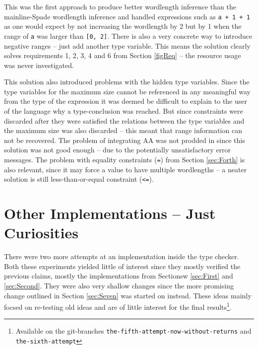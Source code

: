 This was the first approach to produce better wordlength inference than the mainline-Spade wordlength inference and handled expressions such as \verb!a + 1 + 1! as one would expect by not increasing the wordlength by 2 but by 1 when the range of \verb+a+ was larger than \verb+[0, 2]+. There is also a very concrete way to introduce negative ranges -- just add another type variable. This means the solution clearly solves requirements 1, 2, 3, 4 and 6 from Section \ref{figReq} -- the resource usage was never investigated.

This solution also introduced problems with the hidden type variables. Since the type variables for the maximum size cannot be referenced in any meaningful way from the type of the expression it was deemed be difficult to explain to the user of the language why a type-conclusion was reached. But since constraints were discarded after they were satisfied the relations between the type variables and the maximum size was also discarded -- this meant that range information can not be recovered. The problem of integrating AA was not prodded in since this solution was not good enough -- due to the potentially unsatisfactory error messages. The problem with equality constraints (\verb+=+) from Section \ref{sec:Forth} is also relevant, since it may force a value to have multiple wordlengths -- a neater solution is still less-than-or-equal constraint (\verb+<=+).

\section{Other Implementations -- Just Curiosities}
\label{sec:Other}

There were two more attempts at an implementation inside the type checker. Both these experiments yielded little of interest since they mostly verified the previous claims, mostly the implementations from Sectionsw \ref{sec:First} and \ref{sec:Second}. They were also very shallow changes since the more promising change outlined in Section \ref{sec:Seven} was started on instead. These ideas mainly focsed on re-testing old ideas and are of little interest for the final results\cprotect\footnote{Available on the git-branches \verb+the-fifth-attempt-now-without-returns+ and \verb+the-sixth-attempt+}.


